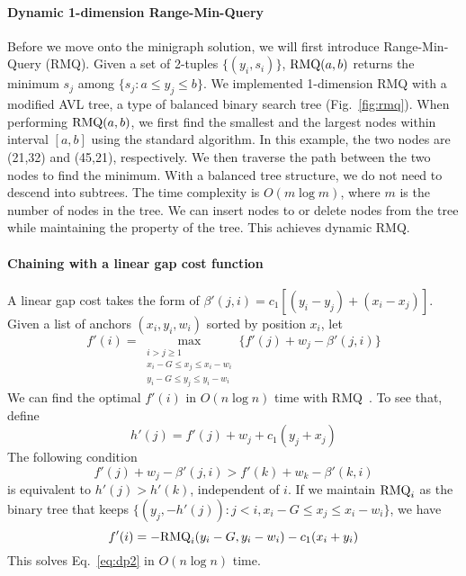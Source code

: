 \documentclass[twocolumn]{bmcart}
\begin{document}
\paragraph*{Dynamic 1-dimension Range-Min-Query}
Before we move onto the minigraph solution, we will first introduce
Range-Min-Query (RMQ). Given a set of 2-tuples $\{(y_i,s_i)\}$, ${\rm
RMQ}(a,b)$ returns the minimum $s_j$ among $\{s_j:a\le y_j\le b\}$.
We implemented 1-dimension RMQ with a modified AVL tree, a type of balanced
binary search tree (Fig.~\ref{fig:rmq}). When performing ${\rm RMQ}(a,b)$, 
we first find the smallest and the largest nodes within interval $[a,b]$ using
the standard algorithm. In this example, the two nodes are (21,32) and (45,21),
respectively. We then traverse the path between the two nodes to find the
minimum. With a balanced tree structure, we do not need to descend into
subtrees. The time complexity is $O(m\log m)$, where $m$ is the number of nodes
in the tree. We can insert nodes to or delete nodes from the tree while
maintaining the property of the tree. This achieves dynamic RMQ.

\paragraph*{Chaining with a linear gap cost function}
A linear gap cost takes the form of
$\beta'(j,i)=c_1[(y_i-y_j)+(x_i-x_j)]$. Given a list of anchors
$(x_i,y_i,w_i)$ sorted by position $x_i$, let
\begin{equation}\label{eq:dp2}
f'(i)=\max_{\substack{\text{$i>j\ge1$}\\ \text{$x_i-G\le x_j\le x_i-w_i$}\\ \text{$y_i-G\le y_j\le y_i-w_i$}}}\big\{f'(j)+w_j-\beta'(j,i)\big\}
\end{equation}
We can find the optimal $f'(i)$ in $O(n\log n)$ time with
RMQ~\cite{DBLP:conf/wabi/AbouelhodaO03,Otto:2011aa}. To see that, define
$$h'(j)=f'(j)+w_j+c_1(y_j+x_j)$$
The following condition
$$f'(j)+w_j-\beta'(j,i)>f'(k)+w_k-\beta'(k,i)$$
is equivalent to $h'(j)>h'(k)$, independent of $i$. If we maintain ${\rm
RMQ}_i$ as the binary tree that keeps $\{(y_j,-h'(j)):j<i,x_i-G\le x_j\le x_i-w_i\}$, we have
$$
f'(i)=-{\rm RMQ}_i(y_i-G,y_i-w_i)-c_1(x_i+y_i)
$$
This solves Eq.~\ref{eq:dp2} in $O(n\log n)$ time.
\end{document}
